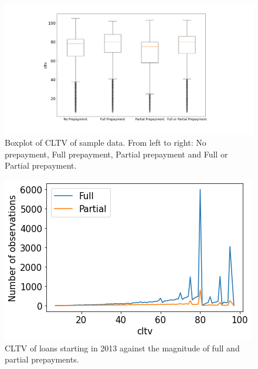         \begin{figure}[H]
            \centering
            \includegraphics[width=\linewidth]{Figures/Boxplot_of_cltv_[2013, 2014, 2015, 2016, 2017, 2018, 2019, 2020]_.png}
            \caption{
                Boxplot of CLTV of sample data. From left to right: 
                No prepayment, Full prepayment, Partial prepayment 
                and Full or Partial prepayment.
                }
            \label{model_boxplot_CLTV}
        \end{figure}
        \begin{figure}
            \centering
            \includegraphics[width=0.6\linewidth]{Figures/CLTV againts Full and Partial prepayments.png}
            \caption{CLTV of loans starting in 2013 against the magnitude of full and partial prepayments.}
            \label{model_CLTV_against_prepayment}
        \end{figure}


